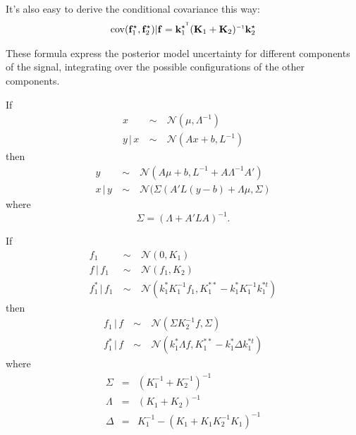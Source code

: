 \documentclass[twoside]{article}
\theoremstyle{definition}
\theoremstyle{remark}
\numberwithin{equation}{section}
\numberwithin{thm}{section}
\newcommand{\Normal}{\mathcal{N}}
\newcommand{\dist}{\ \sim\ }
\def\given{\,|\,}
\begin{document}
It's also easy to derive the conditional covariance this way:
\begin{align*}
\cov(\vf_1^\star, \vf_2^\star) | \vf = \vk_1^{\star\tra} (\vK_1 + \vK_2)\inv \vk_2^\star
\end{align*}

These formula express the posterior model uncertainty for different components of the signal, integrating over the possible configurations of the other components.

\begin{lem}
\label{lem:cond}
If
\begin{eqnarray}
x & \dist & \Normal(\mu, \Lambda^{-1}) \\
y \given x & \dist & \Normal(Ax + b, L^{-1})
\end{eqnarray}
then
\begin{eqnarray}
y & \dist & \Normal(A\mu + b, L^{-1} + A\Lambda^{-1}A') \\
x \given y & \dist & \Normal(\Sigma(A'L(y-b) + \Lambda\mu, \Sigma)
\end{eqnarray}
where
\begin{equation}
\Sigma = (\Lambda + A'LA)^{-1}.
\end{equation}
\end{lem}
\begin{prop}
If
\begin{eqnarray}
f_1 & \dist & \Normal(0, K_1) \\
f \given f_1 & \dist & \Normal(f_1, K_2) \\
f_1^* \given f_1 & \dist & \Normal(k_1^*K_1^{-1}f_1, K_1^{**} - k_1^*K_1^{-1}k_1^{*t})
\end{eqnarray}
then
\begin{eqnarray}
f_1 \given f & \dist & \Normal(\Sigma K_2^{-1}f, \Sigma) \\
f_1^* \given f & \dist & \Normal(k_1^*\Lambda f, K_1^{**} - k_1^*\Delta k_1^{*t})
\end{eqnarray}
where
\begin{eqnarray}
\Sigma & = & (K_1^{-1} + K_2^{-1})^{-1} \\
\Lambda & = & (K_1 + K_2)^{-1} \\
\Delta & = & K_1^{-1} - (K_1 + K_1K_2^{-1}K_1)^{-1}
\end{eqnarray}
\end{prop}
\end{document}
